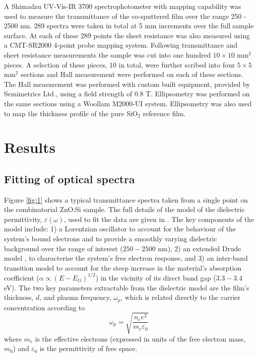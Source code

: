 \documentclass[aps,prl,5p,showpacs,showkeys,twocolumn]{revtex4-1}
\begin{document}
A Shimadzu UV-Vis-IR 3700 spectrophotometer with mapping capability was used to measure the transmittance of the co-sputtered film over the range 250 - 2500 nm. 289 spectra were taken in total at 5 mm increments over the full sample surface. At each of these 289 points the sheet resistance was also measured using a CMT-SR2000 4-point probe mapping system. Following transmittance and sheet resistance measurements the sample was cut into one hundred $10\times10$ mm$^2$ pieces. A selection of these pieces, 10 in total, were further scribed into four $5\times5$ mm$^2$ sections and Hall measurement were performed on each of these sections. The Hall measurement was performed with custom built equipment, provided by Semimetrics Ltd., using a field strength of 0.8 T.  Ellipsometry was performed on the same sections using a Woollam M2000-UI system. Ellipsometry was also used to map the thickness profile of the pure SiO$_{2}$ reference film.

\section{Results}\label{sec:2}

\subsection{Fitting of optical spectra}\label{sec:2.1}

Figure \ref{fig:1} shows a typical transmittance spectra taken from a single point on the combinatorial ZnO:Si sample. The full details of the model of the dielectric permittivity, $\varepsilon(\omega)$, used to fit the data are given in \cite{Treharne2012}. The key components of the model include: 1) a Lorentzian oscillator to account for the behaviour of the system's bound electrons and to provide a smoothly varying dielectric background over the range of interest ($250-2500$ nm), 2) an extended Drude model \cite{Mergel2002}, to characterise the system's free electron response, and 3) an inter-band transition model to account for the steep increase in the material's absorption coefficient ($\alpha \propto (E-E_G)^{1/2}$) in the vicinity of its direct band gap ($3.3 - 3.4$ eV). The two key parameters extractable from the dielectric model are the film's thickness, $d$, and plasma frequency, $\omega_{p}$, which is related directly to the carrier concentration according to
\begin{equation}
\omega_p = \sqrt{\frac{n_e e^2}{m_e \varepsilon_0}}
\end{equation}\label{eqn:1}
where $m_e$ is the effective electrons (expressed in units of the free electron mass, $m_0$) and $\varepsilon_0$ is the permittivity of free space.
\end{document}
